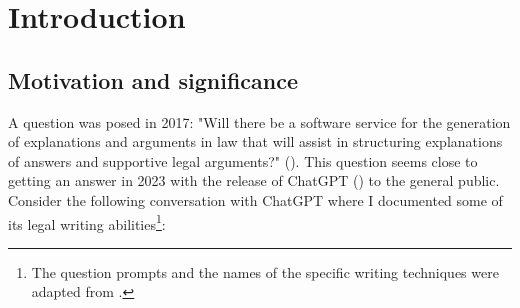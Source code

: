 
\chapter{Introduction} %

\label{chapter1} %

\section{Motivation and significance}
A question was posed in 2017: "Will there be a software service for the generation of explanations and arguments in law that will assist in structuring explanations of answers and supportive legal arguments?" (\cite{ashley_2017}). This question seems close to getting an answer in 2023 with the release of ChatGPT (\cite{openai}) to the general public. Consider the following conversation with ChatGPT where I documented some of its legal writing abilities\footnote{The question prompts and the names of the specific writing techniques were adapted from \cite{bishop2023computer}.}: 
